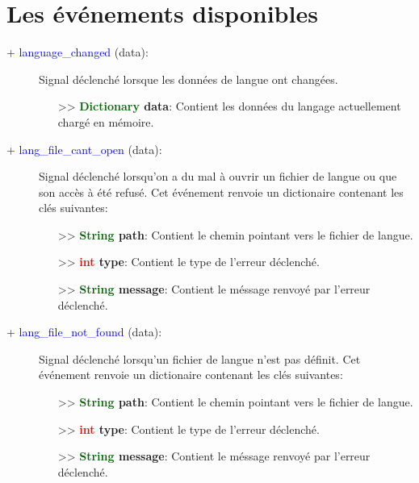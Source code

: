\documentclass[a4paper, 11pt]{article}
\begin{document}
	\section{Les événements disponibles}
	\begin{description}
		\item [+ \textcolor{blue}{language\_changed} (data):] Signal déclenché lorsque les données de langue
		ont changées.
		\begin{itemize}
			\item [>> \textbf{\textcolor{darkgreen}{Dictionary} data}:] Contient les données du langage
			actuellement chargé en mémoire.\\
		\end{itemize}
	\end{description}
	\begin{description}
		\item [+ \textcolor{blue}{lang\_file\_cant\_open} (data):] Signal déclenché lorsqu'on a du mal à
		ouvrir un fichier de langue ou que son accès à été refusé. Cet événement renvoie un dictionaire
		contenant les clés suivantes:
		\begin{itemize}
			\item [>> \textbf{\textcolor{darkgreen}{String} path}:] Contient le chemin pointant vers le
			fichier de langue.
			\item [>> \textbf{\textcolor{red}{int} type}:] Contient le type de l'erreur déclenché.
			\item [>> \textbf{\textcolor{darkgreen}{String} message}:] Contient le méssage renvoyé par 
			l'erreur déclenché.\\
		\end{itemize}
	\end{description}
	\begin{description}
		\item [+ \textcolor{blue}{lang\_file\_not\_found} (data):] Signal déclenché lorsqu'un fichier de
		langue n'est pas définit. Cet événement renvoie un dictionaire contenant les clés suivantes:
		\begin{itemize}
			\item [>> \textbf{\textcolor{darkgreen}{String} path}:] Contient le chemin pointant vers le
			fichier de langue.
			\item [>> \textbf{\textcolor{red}{int} type}:] Contient le type de l'erreur déclenché.
			\item [>> \textbf{\textcolor{darkgreen}{String} message}:] Contient le méssage renvoyé par 
			l'erreur déclenché.\\
		\end{itemize}
	\end{description}
\end{document}
